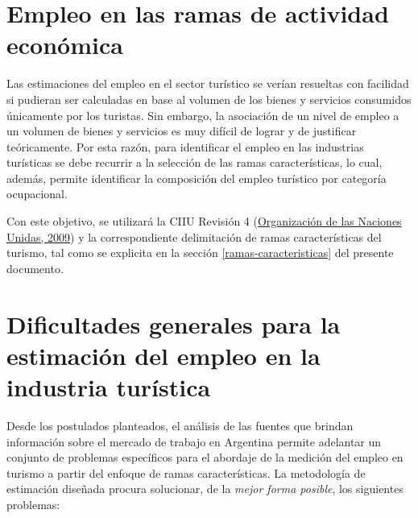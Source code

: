 \documentclass[
  openany]{book}
\begin{document}
\hypertarget{empleo-en-las-ramas-de-actividad-econuxf3mica}{%
\section{Empleo en las ramas de actividad económica}\label{empleo-en-las-ramas-de-actividad-econuxf3mica}}

Las estimaciones del empleo en el sector turístico se verían resueltas con facilidad si pudieran ser calculadas en base al volumen de los bienes y servicios consumidos únicamente por los turistas. Sin embargo, la asociación de un nivel de empleo a un volumen de bienes y servicios es muy difícil de lograr y de justificar teóricamente. Por esta razón, para identificar el empleo en las industrias turísticas se debe recurrir a la selección de las ramas características, lo cual, además, permite identificar la composición del empleo turístico por categoría ocupacional.

Con este objetivo, se utilizará la CIIU Revisión 4 (\protect\hyperlink{ref-ciiurev4}{Organización de las Naciones Unidas, 2009}) y la correspondiente delimitación de ramas características del turismo, tal como se explicita en la sección \ref{ramas-caracteristicas} del presente documento.

\hypertarget{dificultades-generales-para-la-estimaciuxf3n-del-empleo-en-la-industria-turuxedstica}{%
\section{Dificultades generales para la estimación del empleo en la industria turística}\label{dificultades-generales-para-la-estimaciuxf3n-del-empleo-en-la-industria-turuxedstica}}

Desde los postulados planteados, el análisis de las fuentes que brindan información sobre el mercado de trabajo en Argentina permite adelantar un conjunto de problemas específicos para el abordaje de la medición del empleo en turismo a partir del enfoque de ramas características. La metodología de estimación diseñada procura solucionar, de la \emph{mejor forma posible}, los siguientes problemas:
\end{document}
